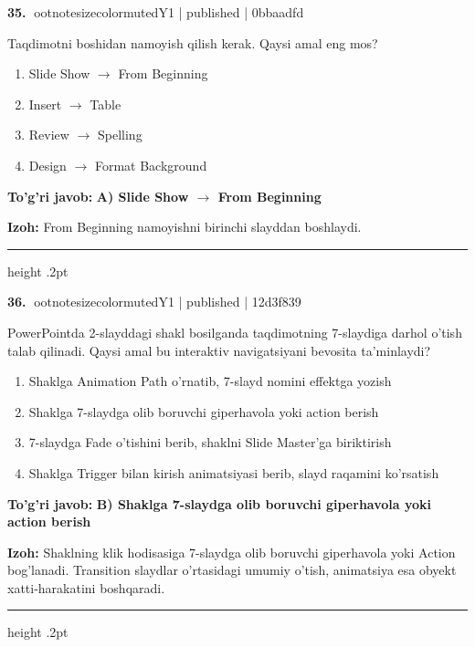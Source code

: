 \documentclass[10pt,a4paper]{article}
\begin{document}
\textbf{\color{ink}35.} {ootnotesizecolor{muted}Y1 | published | 0bbaadfd}
\par
Taqdimotni boshidan namoyish qilish kerak. Qaysi amal eng mos?
\begin{enumerate}[label=\Alph*),leftmargin=9mm]
\item Slide Show \ensuremath{\rightarrow} From Beginning
\item Insert \ensuremath{\rightarrow} Table
\item Review \ensuremath{\rightarrow} Spelling
\item Design \ensuremath{\rightarrow} Format Background
\end{enumerate}
\begin{tcolorbox}[enhanced,breakable,colback=teal!4,colframe=teal!55!black,boxrule=0.45pt,arc=1.2mm,left=2.8mm,right=2.8mm,top=2mm,bottom=2mm]
\textbf{\color{teal}To'g'ri javob:} \textbf{A) Slide Show \ensuremath{\rightarrow} From Beginning}
\par\smallskip
\textbf{Izoh:} From Beginning namoyishni birinchi slayddan boshlaydi.
\end{tcolorbox}
\vspace{2mm}\hrule height .2pt\vspace{2mm}

\textbf{\color{ink}36.} {ootnotesizecolor{muted}Y1 | published | 12d3f839}
\par
PowerPointda 2-slayddagi shakl bosilganda taqdimotning 7-slaydiga darhol o'tish talab qilinadi. Qaysi amal bu interaktiv navigatsiyani bevosita ta'minlaydi?
\begin{enumerate}[label=\Alph*),leftmargin=9mm]
\item Shaklga Animation Path o'rnatib, 7-slayd nomini effektga yozish
\item Shaklga 7-slaydga olib boruvchi giperhavola yoki action berish
\item 7-slaydga Fade o'tishini berib, shaklni Slide Master'ga biriktirish
\item Shaklga Trigger bilan kirish animatsiyasi berib, slayd raqamini ko'rsatish
\end{enumerate}
\begin{tcolorbox}[enhanced,breakable,colback=teal!4,colframe=teal!55!black,boxrule=0.45pt,arc=1.2mm,left=2.8mm,right=2.8mm,top=2mm,bottom=2mm]
\textbf{\color{teal}To'g'ri javob:} \textbf{B) Shaklga 7-slaydga olib boruvchi giperhavola yoki action berish}
\par\smallskip
\textbf{Izoh:} Shaklning klik hodisasiga 7-slaydga olib boruvchi giperhavola yoki Action bog'lanadi. Transition slaydlar o'rtasidagi umumiy o'tish, animatsiya esa obyekt xatti-harakatini boshqaradi.
\end{tcolorbox}
\vspace{2mm}\hrule height .2pt\vspace{2mm}
\end{document}
